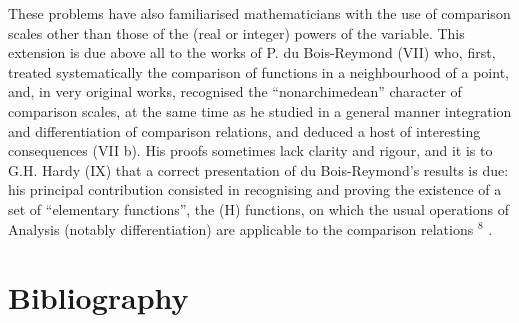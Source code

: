 These problems have also familiarised mathematicians with the use of comparison scales other than those of the (real or integer) powers of the variable. This extension is due above all to the works of P. du Bois-Reymond (VII) who, first, treated systematically the comparison of functions in a neighbourhood of a point, and, in very original works, recognised the ``nonarchimedean'' character of comparison scales, at the same time as he studied in a general manner integration and differentiation of comparison relations, and deduced a host of interesting consequences (VII b). His proofs sometimes lack clarity and rigour, and it is to G.H. Hardy (IX) that a correct presentation of du Bois-Reymond's results is due: his principal contribution consisted in recognising and proving the existence of a set of ``elementary functions'', the (H) functions, on which the usual operations of Analysis (notably differentiation) are applicable to the comparison relations \({}^{8}\) .

\section*{Bibliography}
{}

